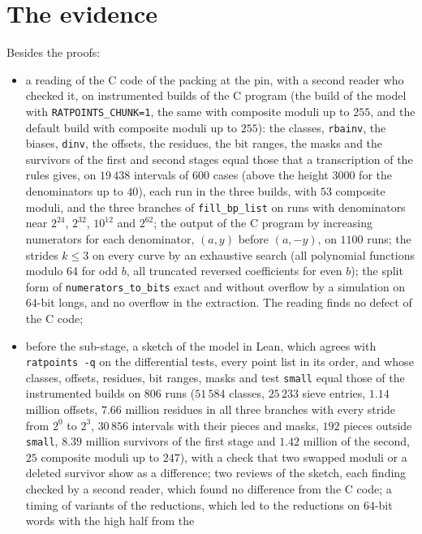 \section{The evidence}\label{sec:packing-evidence}

Besides the proofs:
\begin{itemize}
  \item a reading of the C code of the packing at the pin, with a second reader who checked it, on
    instrumented builds of the C program (the build of the model with \verb|RATPOINTS_CHUNK=1|, the
    same with composite moduli up to $255$, and the default build with composite moduli up to
    $255$): the classes, \verb|rbainv|, the biases, \verb|dinv|, the offsets, the residues, the bit
    ranges, the masks and the survivors of the first and second stages equal those that a
    transcription of the rules gives, on $19\,438$ intervals of $600$ cases (above the height
    $3000$ for the denominators up to $40$), each run in the three builds, with $53$ composite
    moduli, and the three branches of \verb|fill_bp_list| on runs with denominators near $2^{24}$,
    $2^{32}$, $10^{12}$ and $2^{62}$; the output of the C program by increasing numerators for each
    denominator, $(a, y)$ before $(a, -y)$, on $1100$ runs; the strides $k \le 3$ on every curve by
    an exhaustive search (all polynomial functions modulo 64 for odd $b$, all truncated reversed
    coefficients for even $b$); the split form of \verb|numerators_to_bits| exact and without
    overflow by a simulation on $64$-bit longs, and no overflow in the extraction. The reading finds
    no defect of the C code;
  \item before the sub-stage, a sketch of the model in Lean, which agrees with \verb|ratpoints -q|
    on the differential tests, every point list in its order, and whose classes, offsets, residues,
    bit ranges, masks and test \verb|small| equal those of the instrumented builds on $806$ runs
    ($51\,584$ classes, $25\,233$ sieve entries, $1.14$ million offsets, $7.66$ million residues in
    all three branches with every stride from $2^0$ to $2^3$, $30\,856$ intervals with their pieces
    and masks, $192$ pieces outside \verb|small|, $8.39$ million survivors of the first stage and
    $1.42$ million of the second, $25$ composite moduli up to $247$), with a check that two swapped
    moduli or a deleted survivor show as a difference; two reviews of the sketch, each finding
    checked by a second reader, which found no difference from the C code; a timing of variants of
    the reductions, which led to the reductions on $64$-bit words with the high half from the

\end{itemize}
